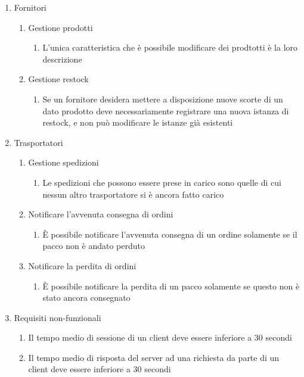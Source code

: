 \documentclass[12pt]{report}
\begin{document}
\begin{enumerate}
\begin{enumerate}
        \end{enumerate}
        \item Fornitori
        \begin{enumerate}
            \item Gestione prodotti
            \begin{enumerate}
                \item L'unica caratteristica che è possibile modificare dei prodtotti è la loro descrizione
            \end{enumerate}
            \item Gestione restock
            \begin{enumerate}
                \item Se un fornitore desidera mettere a disposizione nuove scorte di un dato prodotto deve necessariamente registrare una nuova istanza di restock, e non può modificare le istanze già esistenti
            \end{enumerate}
        \end{enumerate}
        \item Trasportatori
        \begin{enumerate}
            \item Gestione spedizioni
            \begin{enumerate}
                \item Le spedizioni che possono essere prese in carico sono quelle di cui nessun altro trasportatore si è ancora fatto carico
            \end{enumerate}
            \item Notificare l'avvenuta consegna di ordini
            \begin{enumerate}
                \item È possibile notificare l'avvenuta consegna di un ordine solamente se il pacco non è andato perduto
            \end{enumerate}
            \item Notificare la perdita di ordini
            \begin{enumerate}
                \item È possibile notificare la perdita di un pacco solamente se questo non è stato ancora consegnato
            \end{enumerate}
        \end{enumerate}

        \item Requisiti non-funzionali
        
        \begin{enumerate}
            \item Il tempo medio di sessione di un client deve essere inferiore a 30 secondi
            \item Il tempo medio di risposta del server ad una richiesta da parte di un client deve essere inferiore a 30 secondi
        \end{enumerate}
    \end{enumerate}
\end{document}

